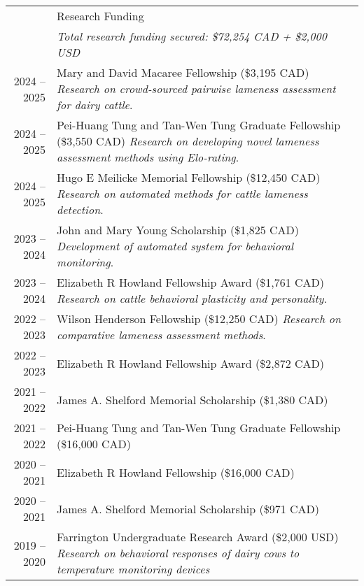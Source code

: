 \documentclass[letterpaper, 11pt]{article}
\newcommand{\headingfont}{\Large\color{OliveGreen}}
\newenvironment{SectionTableSingleSpace}[1]{
	\renewcommand*{\arraystretch}{1.2}
	\setlength{\tabcolsep}{10pt}
	\begin{longtable}{Rp{5.2in}} & #1 \\[0.6em]}
{\end{longtable}\vspace{-.3cm}}
\begin{document}
\begin{SectionTableSingleSpace}{\headingfont Research Funding}
& \textit{Total research funding secured: \$72,254 CAD + \$2,000 USD} \\[6pt]
2024 -- 2025 &
Mary and David Macaree Fellowship (\$3,195 CAD) \newline
\textit{Research on crowd-sourced pairwise lameness assessment for dairy cattle}. \\
2024 -- 2025 &
Pei-Huang Tung and Tan-Wen Tung Graduate Fellowship (\$3,550 CAD) \newline 
\textit{Research on developing novel lameness assessment methods using Elo-rating}. \\
2024 -- 2025 &
Hugo E Meilicke Memorial Fellowship (\$12,450 CAD) \newline
\textit{Research on automated methods for cattle lameness detection}. \\
2023 -- 2024 &
John and Mary Young Scholarship (\$1,825 CAD) \newline
\textit{Development of automated system for behavioral monitoring}. \\
2023 -- 2024 &
Elizabeth R Howland Fellowship Award (\$1,761 CAD) \newline
\textit{Research on cattle behavioral plasticity and personality}. \\
2022 -- 2023 &
Wilson Henderson Fellowship (\$12,250 CAD) \newline
\textit{Research on comparative lameness assessment methods}. \\
2022 -- 2023 &
Elizabeth R Howland Fellowship Award (\$2,872 CAD) \\
2021 -- 2022 &
James A. Shelford Memorial Scholarship (\$1,380 CAD) \\
2021 -- 2022 &
Pei-Huang Tung and Tan-Wen Tung Graduate Fellowship (\$16,000 CAD) \\
2020 -- 2021 &
Elizabeth R Howland Fellowship (\$16,000 CAD) \\
2020 -- 2021 &
James A. Shelford Memorial Scholarship (\$971 CAD) \\
2019 -- 2020 &
Farrington Undergraduate Research Award (\$2,000 USD) \newline
\textit{Research on behavioral responses of dairy cows to temperature monitoring devices}
\end{SectionTableSingleSpace}
\end{document}
